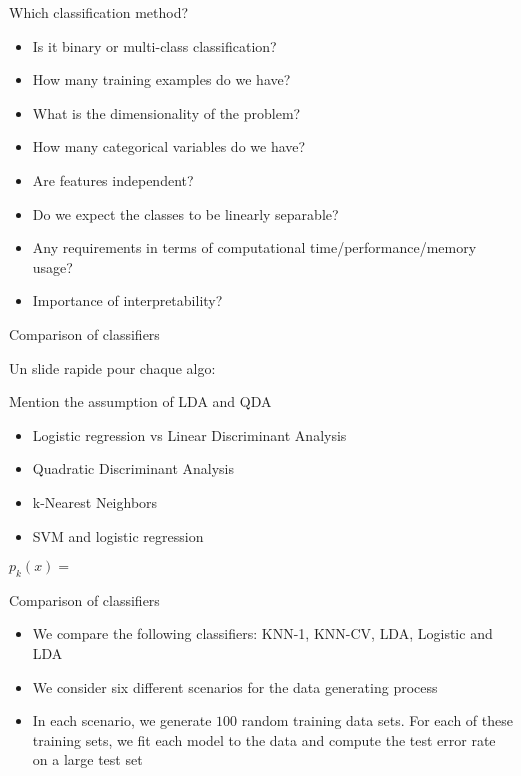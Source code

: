 \documentclass[14pt]{beamer}
\begin{document}
\begin{frame}{Which classification method?}

\begin{itemize}
	\item Is it binary or multi-class classification?
	\item How many training examples do we have?
	\item What is the dimensionality of the problem?
	\item How many categorical variables do we have?
	\item Are features independent?
	\item Do we expect the classes to be linearly separable?
	\item Any requirements in terms of computational time/performance/memory usage?
	\item Importance of interpretability?
\end{itemize}

\end{frame}

\begin{frame}{Comparison of classifiers}

Un slide rapide pour chaque algo: 

Mention the assumption of LDA and QDA

\begin{itemize}
	\item Logistic regression vs Linear Discriminant Analysis
	\item Quadratic Discriminant Analysis
	\item k-Nearest Neighbors
	\item SVM and logistic regression
\end{itemize}


$p_k(x) = \frac{}{}$

\end{frame}


\begin{frame}{Comparison of classifiers}

\begin{itemize}
	\item We compare the following classifiers: \alert{KNN-1}, \alert{KNN-CV}, \alert{LDA}, \alert{Logistic} and \alert{LDA}
	\item We consider six different scenarios for the data generating process
	\item In each scenario, we generate $100$ random training data sets. For each of these training sets, we fit each model to the data and compute the test error rate on a large test set
\end{itemize}


\end{frame}
\end{document}

